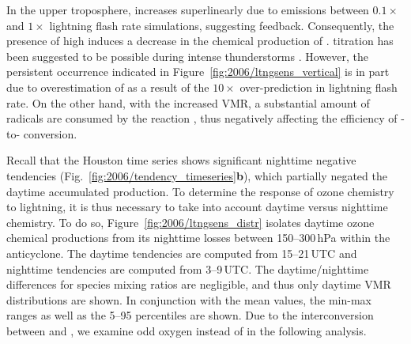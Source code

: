 In the upper troposphere,  increases superlinearly due to {\lnox} emissions between $0.1\times$
and $1\times$ lightning flash rate simulations, suggesting feedback. Consequently, the presence of high
 induces a decrease in the chemical production
of .  titration has been suggested to be possible during intense thunderstorms \citep[e.g.][]{Cummings:2013vn}.
However, the persistent occurrence indicated in Figure~\ref{fig:2006/ltngsens_vertical} is in part due to overestimation of
 as a result of the $10\times$ over-prediction in lightning flash rate. On the other hand, with the increased
 VMR, a substantial amount of   radicals are consumed by the reaction ,
thus negatively affecting the efficiency of -to- conversion.


Recall that the Houston time series shows significant nighttime negative tendencies (Fig.~\ref{fig:2006/tendency_timeseries}{\bf b}),
which partially negated the daytime accumulated production. To determine the response of ozone chemistry to lightning, it is thus
necessary to take into account daytime versus nighttime chemistry. To do so,
Figure~\ref{fig:2006/ltngsens_distr} isolates daytime ozone chemical productions from its nighttime losses
between 150--300\,\unit{hPa} within the anticyclone. The daytime tendencies are computed
from 15--21\,\unit{UTC} and nighttime tendencies are computed from 3--9\,\unit{UTC}. The daytime/nighttime differences for species
mixing ratios are negligible, and thus only daytime VMR distributions are shown. In conjunction with the mean values, the min-max ranges as well as the
5--95 percentiles are shown. Due to the interconversion between  and , we examine odd oxygen
 instead of  in the following analysis.

